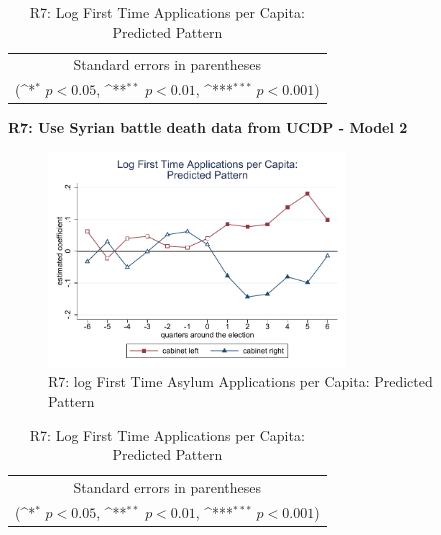 \documentclass[10pt,a4paper]{scrartcl}
\begin{document}
\begin{table}[!ht]\centering
	\renewcommand{\arraystretch}{1.25}
	\def\sym#1{\ifmmode^{#1}\else\(^{#1}\)\fi}
	\caption{R7: Log First Time Applications per Capita: Predicted Pattern}
	\begin{tabular}{l*{2}{c}}
		\hline\hline
		
		\hline\hline
		\multicolumn{3}{c}{\footnotesize Standard errors in parentheses} \\
		\multicolumn{3}{c}{\footnotesize (\sym{*} \(p<0.05\), \sym{**} \(p<0.01\), \sym{***} \(p<0.001\))}\\
	\end{tabular}
\end{table}

\clearpage
\textbf{R7: Use Syrian battle death data from UCDP - Model 2}
\begin{figure}[!ht]
	\centering
	\includegraphics[width=0.7\textwidth]{figures_edited/app_graph2_R7.pdf}
	\caption{R7: log First Time Asylum Applications per Capita: Predicted Pattern}
\end{figure}

\begin{table}[!ht]\centering
	\footnotesize
	\renewcommand{\arraystretch}{1.2}
	\def\sym#1{\ifmmode^{#1}\else\(^{#1}\)\fi}
	\caption{R7: Log First Time Applications per Capita: Predicted Pattern}
	\begin{tabular}{l*{2}{c}}
		\hline\hline
		
		\hline\hline
		\multicolumn{3}{c}{\footnotesize Standard errors in parentheses} \\
		\multicolumn{3}{c}{\footnotesize (\sym{*} \(p<0.05\), \sym{**} \(p<0.01\), \sym{***} \(p<0.001\))} \\
	\end{tabular}
\end{table}
\end{document}
